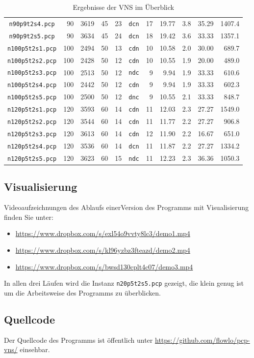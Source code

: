 \documentclass[paper=a4,fontsize=12pt]{scrartcl}
\begin{document}
\begin{table}[!htbp]
\begin{tabular}{c|rrr|r|c|rrr|r|r}
\texttt{n90p9t2s4.pcp} & 90	& 3619	& 45	& 23 & \texttt{dcn} & 17 & 19.77 & 3.8 & 35.29 & 1407.4\\
\texttt{n90p9t2s5.pcp} & 90	& 3634	& 45	& 24 & \texttt{dcn} & 18 & 19.42 & 3.6 & 33.33 & 1357.1\\
\texttt{n100p5t2s1.pcp} & 100	& 2494	& 50	& 13 & \texttt{cdn} & 10 & 10.58 & 2.0 & 30.00 & 689.7\\
\texttt{n100p5t2s2.pcp} & 100	& 2428	& 50	& 12 & \texttt{cdn} & 10 & 10.55 & 1.9 & 20.00 & 489.0\\
\texttt{n100p5t2s3.pcp} & 100	& 2513	& 50	& 12 & \texttt{ndc} & 9 & 9.94 & 1.9 & 33.33 & 610.6\\
\texttt{n100p5t2s4.pcp} & 100	& 2442	& 50	& 12 & \texttt{cdn} & 9 & 9.94 & 1.9 & 33.33 & 602.3\\
\texttt{n100p5t2s5.pcp} & 100	& 2500	& 50	& 12 & \texttt{dnc} & 9 & 10.55 & 2.1 & 33.33 & 848.7\\
\texttt{n120p5t2s1.pcp} & 120	& 3593	& 60	& 14 & \texttt{cdn} & 11 & 12.03 & 2.3 & 27.27 & 1549.0\\
\texttt{n120p5t2s2.pcp} & 120	& 3544	& 60	& 14 & \texttt{cdn} & 11 & 11.77 & 2.2 & 27.27 & 906.8\\
\texttt{n120p5t2s3.pcp} & 120	& 3613	& 60	& 14 & \texttt{cdn} & 12 & 11.90 & 2.2 & 16.67 & 651.0\\
\texttt{n120p5t2s4.pcp} & 120	& 3536	& 60	& 14 & \texttt{dcn} & 11 & 11.87 & 2.2 & 27.27 & 1334.2\\
\texttt{n120p5t2s5.pcp} & 120	& 3623	& 60	& 15 & \texttt{ndc} & 11 & 12.23 & 2.3 & 36.36 & 1050.3\\
\end{tabular}
\caption{Ergebnisse der VNS im Überblick}
\label{tab:result}
\end{table}

\subsection{Visualisierung}

Videoaufzeichnungen des Ablaufs einerVersion des Programms mit Visualisierung finden Sie unter:

\begin{itemize}
	\item \url{https://www.dropbox.com/s/exl54o9vvty8lc3/demo1.mp4}
	\item \url{https://www.dropbox.com/s/kl96yzbz3fteazd/demo2.mp4}
	\item \url{https://www.dropbox.com/s/bwsd130cplt4c07/demo3.mp4}
\end{itemize}

In allen drei Läufen wird die Instanz \texttt{n20p5t2s5.pcp} gezeigt, die klein genug ist um die Arbeitsweise des Programms zu überblicken.

\subsection{Quellcode}

Der Quellcode des Programms ist öffentlich unter \url{https://github.com/flowlo/pcp-vns/} einsehbar.
\end{document}
